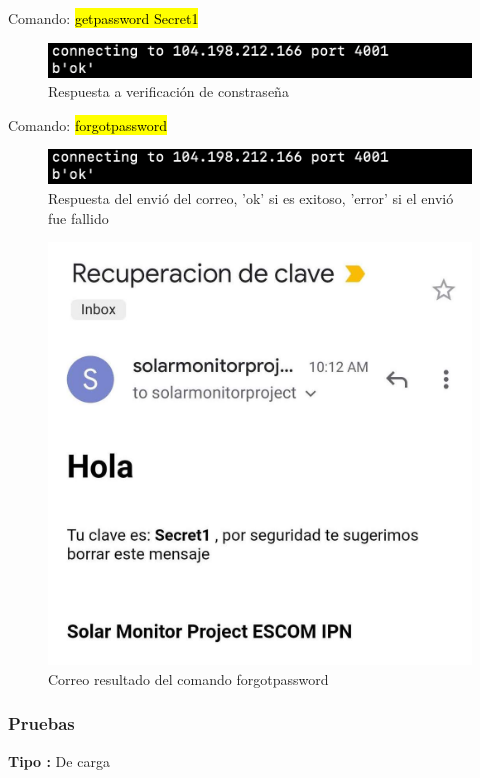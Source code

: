 Comando: \hl{getpassword Secret1}
\begin{figure}[H]
	\centering
	\includegraphics[scale=.5]{Capitulo5/images/forgot_pass.png}
	\caption{Respuesta a verificación de constraseña}
	\label{fig:}
\end{figure} 

Comando: \hl{forgotpassword}
\begin{figure}[H]
	\centering
	\includegraphics[scale=.5]{Capitulo5/images/forgot_pass.png}
	\caption{Respuesta del envió del correo, 'ok' si es exitoso, 'error' si el envió fue fallido}
	\label{fig:}
\end{figure} 

\begin{figure}[H]
	\centering
	\includegraphics[scale=.2]{Capitulo5/images/correo.jpg}
	\caption{Correo resultado del comando forgotpassword}
	\label{fig:}
\end{figure}

\subsubsection{Pruebas}
\textbf{Tipo :} De carga \\ \newline

